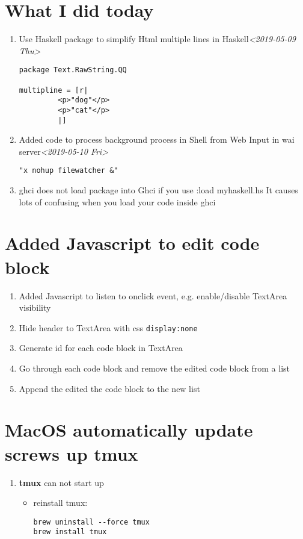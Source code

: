\documentclass[11pt]{article}
\author{cat}
\date{\today}
\title{}
\begin{document}
\tableofcontents

\section{What I did today}
\label{sec:org49ad699}
\begin{enumerate}
\item Use Haskell package to simplify Html multiple lines in Haskell\textit{<2019-05-09 Thu>}
\begin{verbatim}
package Text.RawString.QQ

multipline = [r| 
	     <p>"dog"</p>
	     <p>"cat"</p>
	     |]
\end{verbatim}

\item Added code to process background process in Shell from Web Input in wai server\textit{<2019-05-10 Fri>}
\begin{verbatim}
"x nohup filewatcher &" 
\end{verbatim}

\item ghci does not load package into Ghci if you use :load myhaskell.hs
It causes lots of confusing when you load your code inside ghci
\end{enumerate}

\section{Added Javascript to edit code block}
\label{sec:org9a103a4}
\begin{enumerate}
\item Added Javascript to listen to onclick event, e.g. enable/disable TextArea visibility
\item Hide header to TextArea with css \texttt{display:none}
\item Generate id for each code block in TextArea
\item Go through each code block and remove the edited code block from a list
\item Append the edited the code block to the new list
\end{enumerate}

\section{MacOS automatically update screws up \textbf{tmux}}
\label{sec:org177e190}
\begin{enumerate}
\item \textbf{tmux} can not start up
\begin{itemize}
\item reinstall tmux:
\begin{verbatim}
brew uninstall --force tmux
brew install tmux
\end{verbatim}
\end{itemize}
\end{enumerate}
\end{document}
